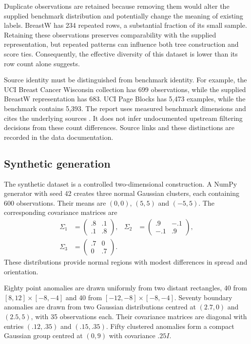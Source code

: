 \documentclass[11pt]{article}
\begin{document}
Duplicate observations are retained because removing them would alter the supplied benchmark distribution and potentially change the meaning of existing labels. BreastW has 234 repeated rows, a substantial fraction of its small sample. Retaining these observations preserves comparability with the supplied representation, but repeated patterns can influence both tree construction and score ties. Consequently, the effective diversity of this dataset is lower than its row count alone suggests.

Source identity must be distinguished from benchmark identity. For example, the UCI Breast Cancer Wisconsin collection has 699 observations, while the supplied BreastW representation has 683. UCI Page Blocks has 5,473 examples, while the benchmark contains 5,393. The report uses measured benchmark dimensions and cites the underlying sources \citep{uciThyroid,uciBreast,uciPage,uciYeast}. It does not infer undocumented upstream filtering decisions from these count differences. Source links and these distinctions are recorded in the data documentation.

\subsection{Synthetic generation}
The synthetic dataset is a controlled two-dimensional construction. A NumPy generator with seed 42 creates three normal Gaussian clusters, each containing 600 observations. Their means are $(0,0)$, $(5,5)$ and $(-5,5)$. The corresponding covariance matrices are
\begin{align}
\Sigma_1&=\begin{pmatrix}.8&.1\\.1&.8\end{pmatrix},&
\Sigma_2&=\begin{pmatrix}.9&-.1\\-.1&.9\end{pmatrix},\nonumber\\
\Sigma_3&=\begin{pmatrix}.7&0\\0&.7\end{pmatrix}.&&
\end{align}
These distributions provide normal regions with modest differences in spread and orientation.

Eighty point anomalies are drawn uniformly from two distant rectangles, 40 from $[8,12]\times[-8,-4]$ and 40 from $[-12,-8]\times[-8,-4]$. Seventy boundary anomalies are drawn from two Gaussian distributions centred at $(2.7,0)$ and $(2.5,5)$, with 35 observations each. Their covariance matrices are diagonal with entries $(.12,.35)$ and $(.15,.35)$. Fifty clustered anomalies form a compact Gaussian group centred at $(0,9)$ with covariance $.25I$.
\end{document}
